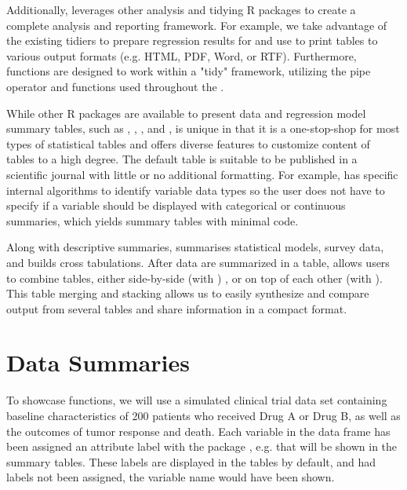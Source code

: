 Additionally,  leverages other analysis and tidying R packages to create a complete analysis and reporting framework.
For example, we take advantage of the existing  tidiers to prepare regression results for  and use  \citep{gt} to print  tables to various output formats (e.g. HTML, PDF, Word, or RTF).
Furthermore,  functions are designed to work within a "tidy" framework, utilizing the  pipe operator and  \citep{tidyselect} functions used throughout the  \citep{tidyverse}.

While other R packages are available to present data and regression model summary tables, such as , , , and ,  is unique in that it is a one-stop-shop for most types of statistical tables and offers diverse features to customize content of tables to a high degree. 
The default  table is suitable to be published in a scientific journal with little or no additional formatting.
For example,  has specific internal algorithms to identify variable data types so the user does not have to specify if a variable should be displayed with categorical or continuous summaries, which yields summary tables with minimal code.

Along with descriptive summaries,  summarises statistical models, survey data, and builds cross tabulations. 
After data are summarized in a table,  allows users to combine tables, either side-by-side (with ) , or on top of each other (with ). 
This table merging and stacking allows us to easily synthesize and compare output from several tables and share information in a compact format.   

\section{Data Summaries}

To showcase  functions, we will use a simulated clinical trial data set containing baseline characteristics of 200 patients who received Drug A or Drug B, as well as the outcomes of tumor response and death.
Each variable in the data frame has been assigned an attribute label with the  package \citep{labelled}, e.g.  that will be shown in the summary tables. 
These labels are displayed in the  tables by default, and had labels not been assigned, the variable name would have been shown.

